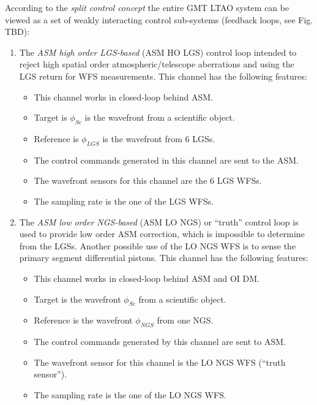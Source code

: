 According to the \emph{split control concept} 
the entire GMT LTAO system can be viewed as a set of weakly interacting
control sub-systems (feedback loops, see Fig. TBD):
\begin{enumerate}
	\item The \emph{ASM high order LGS-based} (ASM HO LGS) 
	control loop intended to reject high spatial order atmospheric/telescope
	aberrations and using the LGS return for WFS measurements. This channel has
	the following features:
	\begin{itemize}
		\item This channel works in closed-loop behind ASM.
		\item Target is $\phi_{Sc}$ is the wavefront from a scientific object.
		\item Reference is $\phi_{LGS}$ is the wavefront from 6 LGSs.
	  \item The control commands generated in this channel are sent to the ASM.
	  \item The wavefront sensors for this channel are the 6 LGS WFSs.
	  \item The sampling rate is the one of the LGS WFSs.
	\end{itemize}

	\item The \emph{ASM low order NGS-based} (ASM LO NGS) or ``truth'' control
	loop is used to provide low order ASM correction, which is impossible to
	determine from the LGSs. Another possible use of the LO NGS WFS is to sense
	the primary segment differential pistons.  This channel has the following features:
	\begin{itemize}
		\item This channel works in closed-loop behind ASM and OI DM.
		\item Target is the wavefront $\phi_{Sc}$ from a scientific object.
		\item Reference is the wavefront $\phi_{NGS}$ from one NGS.
	  \item The control commands generated by this channel are sent to ASM.
	  \item The wavefront sensor for this channel is the LO NGS WFS (``truth
	  sensor'').
		\item The sampling rate is the one of the LO NGS WFS.
	\end{itemize}


\end{enumerate}
